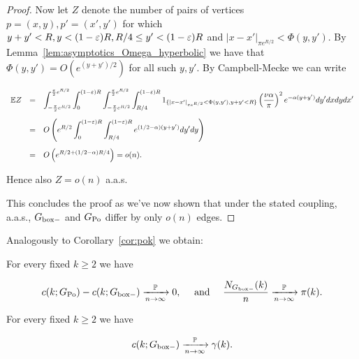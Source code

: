 \begin{proof}
Now let $Z$ denote the number of pairs of vertices $p = (x,y), p'=(x',y')$
for which $y+y'<R, y < (1-\varepsilon)R, R/4 \leq y' < (1-\varepsilon)R$ and $|x-x'|_{\pi e^{R/2}} < \Phi(y,y')$.
By Lemma~\ref{lem:asymptotics_Omega_hyperbolic} we have that $\Phi(y,y') = O( e^{(y+y')/2} )$ 
for all such $y,y'$.
By Campbell-Mecke we can write

$$ \begin{array}{rcl} 
{\mathbb E} Z 
& = & \displaystyle
\int_{-\frac{\pi}{2}e^{R/2}}^{\frac{\pi}{2}e^{R/2}}\int_0^{(1-\varepsilon)R}
\int_{-\frac{\pi}{2}e^{R/2}}^{\frac{\pi}{2}e^{R/2}}\int_{R/4}^{(1-\varepsilon)R} 
1_{\{|x-x'|_{\pi e^{R/2}}<\Phi(y,y'), y+y'<R\}}\left(\frac{\nu\alpha}{\pi}\right)^2 e^{-\alpha(y+y')}dy'dxdydx' \\[4ex]
& = & \displaystyle
O\left( e^{R/2} \int_0^{(1-\varepsilon)R} \int_{R/4}^{(1-\varepsilon)R} e^{(1/2-\alpha)(y+y')} dy'dy \right) \\[4ex]
& = & \displaystyle
O\left( e^{R/2 + (1/2-\alpha) R/4} \right) = o(n).
\end{array} $$ 

\noindent
Hence also $Z = o(n)$ a.a.s.

This concludes the proof as we've now shown that under the stated coupling, a.a.s., $G_{\mathrm{box}-}$ and $G_{{\mathrm{Po}}}$ differ by only $o(n)$ edges.
\end{proof}

Analogously to Corollary~\ref{cor:pok} we obtain:

\begin{corollary}\label{cor:GPoGboxH}
For every fixed $k\geq 2$ we have 

$$c(k;G_{{\mathrm{Po}}}) - c(k;G_{\mathrm{box}-}) \xrightarrow[n \rightarrow \infty]{\mathbb{P}} 0, \quad\text{ and }\quad  
\frac{N_{G_{\mathrm{box}-}}(k)}{n} \xrightarrow[n\to\infty]{\mathbb{P}} {\pi}(k). $$

\end{corollary}


\begin{lemma}\label{lem:ckGboxH} 
For every fixed $k\geq 2$ we have

 $$ c(k;G_{\mathrm{box}-}) \xrightarrow[n \rightarrow \infty]{\mathbb{P}}  \gamma(k). $$

 \end{lemma}

